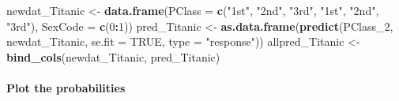 \documentclass[]{article}
\newenvironment{Shaded}{\begin{snugshade}}{\end{snugshade}}
\newcommand{\DataTypeTok}[1]{\textcolor[rgb]{0.13,0.29,0.53}{#1}}
\newcommand{\DecValTok}[1]{\textcolor[rgb]{0.00,0.00,0.81}{#1}}
\newcommand{\KeywordTok}[1]{\textcolor[rgb]{0.13,0.29,0.53}{\textbf{#1}}}
\newcommand{\NormalTok}[1]{#1}
\newcommand{\OperatorTok}[1]{\textcolor[rgb]{0.81,0.36,0.00}{\textbf{#1}}}
\newcommand{\OtherTok}[1]{\textcolor[rgb]{0.56,0.35,0.01}{#1}}
\newcommand{\StringTok}[1]{\textcolor[rgb]{0.31,0.60,0.02}{#1}}
\let\oldparagraph\paragraph
\renewcommand{\paragraph}[1]{\oldparagraph{#1}\mbox{}}
\begin{document}
\begin{Shaded}
\begin{Highlighting}[]
\NormalTok{newdat_Titanic <-}\StringTok{ }\KeywordTok{data.frame}\NormalTok{(}\DataTypeTok{PClass =} \KeywordTok{c}\NormalTok{(}\StringTok{"1st"}\NormalTok{, }\StringTok{"2nd"}\NormalTok{, }\StringTok{"3rd"}\NormalTok{, }\StringTok{"1st"}\NormalTok{, }
    \StringTok{"2nd"}\NormalTok{, }\StringTok{"3rd"}\NormalTok{), }\DataTypeTok{SexCode =} \KeywordTok{c}\NormalTok{(}\DecValTok{0}\OperatorTok{:}\DecValTok{1}\NormalTok{))}
\NormalTok{pred_Titanic <-}\StringTok{ }\KeywordTok{as.data.frame}\NormalTok{(}\KeywordTok{predict}\NormalTok{(PClass_}\DecValTok{2}\NormalTok{, newdat_Titanic, }\DataTypeTok{se.fit =} \OtherTok{TRUE}\NormalTok{, }
    \DataTypeTok{type =} \StringTok{"response"}\NormalTok{))}
\NormalTok{allpred_Titanic <-}\StringTok{ }\KeywordTok{bind_cols}\NormalTok{(newdat_Titanic, pred_Titanic)}
\end{Highlighting}
\end{Shaded}

\hypertarget{plot-the-probabilities}{%
\paragraph{Plot the probabilities}\label{plot-the-probabilities}}
\end{document}
